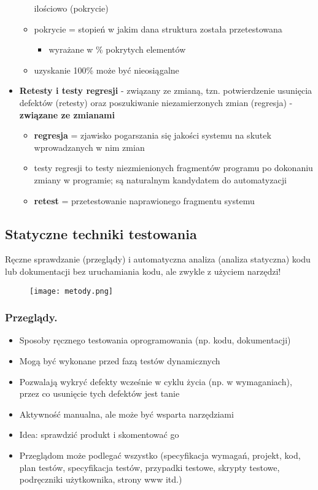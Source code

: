 \documentclass[../main.tex]{subfiles}
\begin{document}
\begin{itemize}
\begin{itemize}
            ilościowo (pokrycie)
            \item pokrycie = stopień w jakim dana struktura została przetestowana
            \begin{itemize}
                \item wyrażane w \% pokrytych elementów
            \end{itemize}
            \item uzyskanie 100\% może być nieosiągalne
        \end{itemize}
        \item \textbf{Retesty i testy regresji} - związany ze zmianą, tzn. potwierdzenie usunięcia defektów
        (retesty) oraz poszukiwanie niezamierzonych zmian (regresja) - \textbf{związane ze zmianami}
        \begin{itemize}
            \item \textbf{regresja} = zjawisko pogarszania się jakości systemu na skutek
            wprowadzanych w nim zmian
            \item testy regresji to testy niezmienionych fragmentów programu
            po dokonaniu zmiany w programie; są naturalnym kandydatem do automatyzacji
            \item \textbf{retest} = przetestowanie naprawionego fragmentu systemu
        \end{itemize}
    \end{itemize}

    \subsection{Statyczne techniki testowania}
    Ręczne sprawdzanie (przeglądy) i automatyczna analiza (analiza statyczna) kodu lub dokumentacji
    bez uruchamiania kodu, ale zwykle z użyciem narzędzi!

    \begin{figure}[H]
        \texttt{[image: metody.png]}
    \end{figure}

    \subsubsection{Przeglądy.}
    \begin{itemize}
        \item Sposoby ręcznego testowania oprogramowania (np. kodu, dokumentacji)
        \item Mogą być wykonane przed fazą testów dynamicznych
        \item Pozwalają wykryć defekty wcześnie w cyklu życia (np. w wymaganiach),
        przez co usunięcie tych defektów jest tanie
        \item Aktywność manualna, ale może być wsparta narzędziami
        \item Idea: sprawdzić produkt i skomentować go
        \item Przeglądom może podlegać wszystko (specyfikacja wymagań, projekt,
        kod, plan testów, specyfikacja testów, przypadki testowe, skrypty testowe,
        podręczniki użytkownika, strony www itd.)
    \end{itemize}
\end{document}
